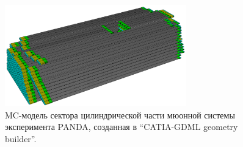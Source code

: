 \begin{figure}[H]
\centering
\includegraphics[width=0.7\textwidth]{pictures/PANDA_MUCH_part.png}
\caption{MC-модель сектора цилиндрической части мюонной системы эксперимента PANDA, созданная в ``CATIA-GDML geometry builder''.}
\label{fig:PandaMuonPart}
\end{figure}

